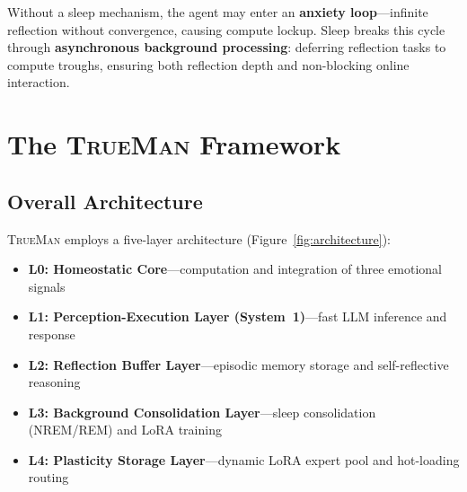 \documentclass[pdflatex,sn-mathphys-num]{sn-jnl}
\newcommand{\TrueMan}{\textsc{TrueMan}}
\theoremstyle{thmstyleone}%
\theoremstyle{thmstyletwo}%
\theoremstyle{thmstylethree}%
\begin{document}
Without a sleep mechanism, the agent may enter an \textbf{anxiety loop}---infinite reflection without convergence, causing compute lockup. Sleep breaks this cycle through \textbf{asynchronous background processing}: deferring reflection tasks to compute troughs, ensuring both reflection depth and non-blocking online interaction.

\section{The \TrueMan{} Framework}\label{sec:framework}

\subsection{Overall Architecture}

\TrueMan{} employs a five-layer architecture (Figure~\ref{fig:architecture}):

\begin{itemize}[leftmargin=2em]
    \item \textbf{L0: Homeostatic Core}---computation and integration of three emotional signals
    \item \textbf{L1: Perception-Execution Layer (System~1)}---fast LLM inference and response
    \item \textbf{L2: Reflection Buffer Layer}---episodic memory storage and self-reflective reasoning
    \item \textbf{L3: Background Consolidation Layer}---sleep consolidation (NREM/REM) and LoRA training
    \item \textbf{L4: Plasticity Storage Layer}---dynamic LoRA expert pool and hot-loading routing
\end{itemize}
\end{document}
